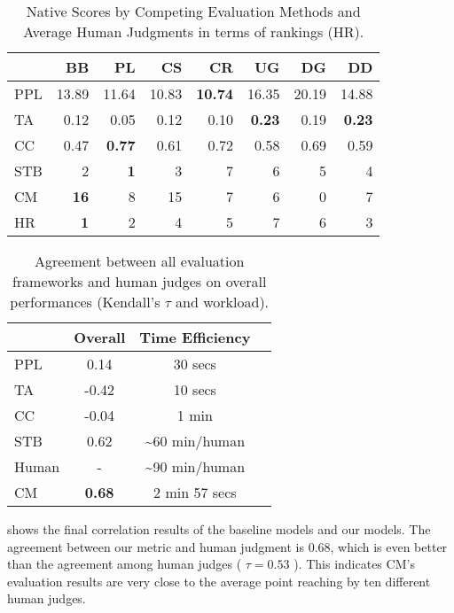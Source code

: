 \begin{table}[ht!]
\centering
\scriptsize
\begin{tabular}{lrrrrrrr}
\toprule
& BB &PL& CS & CR & UG & DG & DD  \\ \midrule
PPL & 13.89 &11.64 &10.83 &\textbf{10.74} &16.35 & 20.19 & 14.88  \\
TA & 0.12 & 0.05& 0.12& 0.10 & \textbf{0.23} & 0.19& \textbf{0.23}  \\
CC& 0.47 &\textbf{0.77} &0.61  &0.72 &0.58  & 0.69 & 0.59  \\ 
STB & 2 &\textbf{1} &3 & 7& 6 & 5 & 4\\
CM &\textbf{16}  &8&  15&7 &6& 0& 7\\\midrule
HR& \textbf{1} &2& 4& 5& 7&6 & 3\\
\bottomrule
\end{tabular}
\caption{Native Scores by Competing Evaluation Methods and 
Average Human Judgments in terms of rankings (HR).}
\label{tab:baseline-scoring}
\end{table}



\begin{table}[th]
\centering
\scriptsize
\begin{tabular}{lccc}
\toprule
 & Overall & Time Efficiency\\ \midrule
PPL  &0.14 & 30 secs \\
TA&-0.42 & 10 secs \\
CC&-0.04 & 1 min\\
STB &0.62 & \textasciitilde 60 min/human\\
Human & -  & \textasciitilde 90 min/human \\
CM&\textbf{ 0.68} & 2 min 57 secs\\
 \bottomrule
\end{tabular}
\caption{Agreement between all evaluation frameworks and 
human judges on
overall performances (Kendall's $\tau$ and workload). }
\label{tab:main}
\end{table}

 shows the final correlation results of the baseline models and our models. 
The agreement between our metric and human judgment is 0.68,
 which is even better than the agreement among human judges ( $\tau = 0.53$ ). 
This indicates CM's evaluation results are very close to the average point reaching by ten different human judges. 


